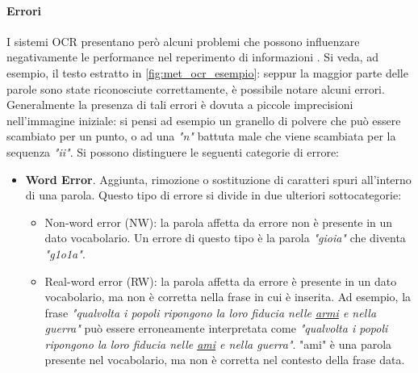 \paragraph{Errori}
I sistemi OCR presentano però alcuni problemi che possono influenzare negativamente le performance nel reperimento di informazioni \cite{impatto_ocr_1}\cite{impatto_ocr_2}. Si veda, ad esempio, il testo estratto in \autoref{fig:met_ocr_esempio}: seppur la maggior parte delle parole sono state riconosciute correttamente, è possibile notare alcuni errori. 
Generalmente la presenza di tali errori è dovuta a piccole imprecisioni nell'immagine iniziale: si pensi ad esempio un granello di polvere che può essere scambiato per un punto, o ad una \textit{"n"} battuta male che viene scambiata per la sequenza \textit{"ii"}.
Si possono distinguere le seguenti categorie di errore:
\begin{itemize}
\item \textbf{Word Error}. Aggiunta, rimozione o sostituzione di caratteri spuri all'interno di una parola. Questo tipo di errore si divide in due ulteriori sottocategorie:
	\begin{itemize}
	\item Non-word error (NW): la parola affetta da errore non è presente in un dato vocabolario. Un errore di questo tipo è la parola \textit{"gioia"} che diventa \textit{"g1o1a"}.
	\item Real-word error (RW): la parola affetta da errore è presente in un dato vocabolario, ma non è corretta nella frase in cui è inserita. Ad esempio, la frase \textit{"qualvolta i popoli ripongono la loro fiducia  nelle \ul{armi} e nella guerra"} può essere erroneamente interpretata come \textit{"qualvolta i popoli ripongono la loro fiducia  nelle \ul{ami} e nella guerra"}. "ami" è una parola presente nel vocabolario, ma non è corretta nel contesto della frase data.
	\end{itemize}
	

\end{itemize}
